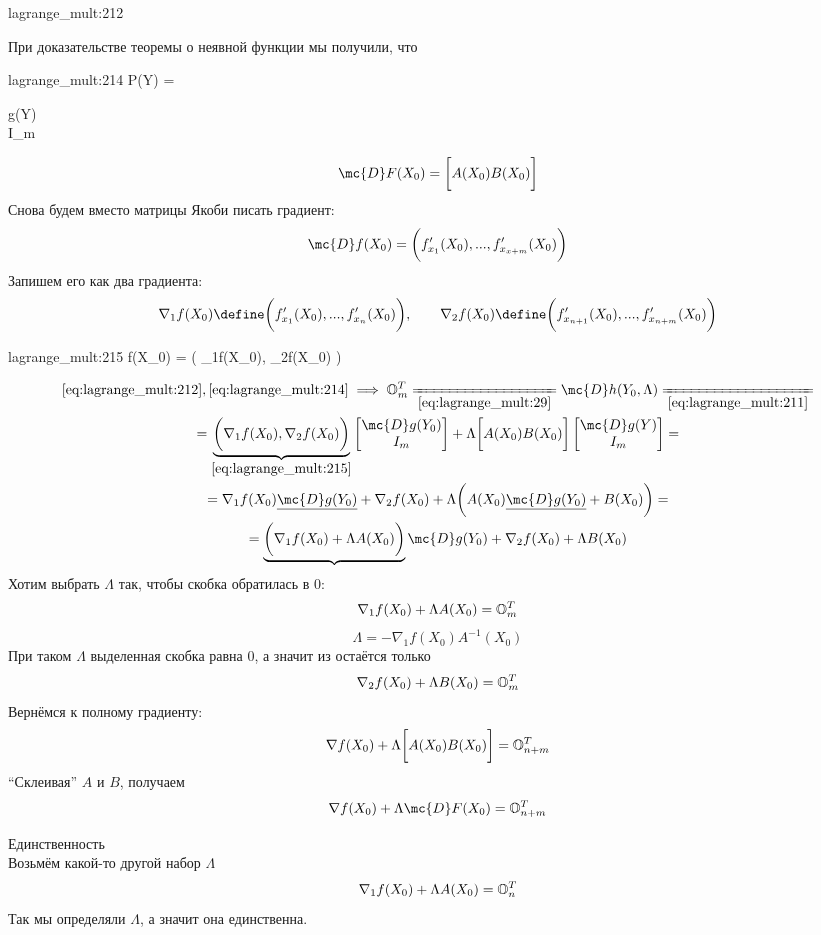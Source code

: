 \begin{iproof}
\begin{equ}{lagrange_mult:212}
\begin{rcases}
		\end{rcases}
	\end{equ}
	При доказательстве теоремы о неявной функции мы получили, что
	\begin{equ}{lagrange_mult:214}
		P(Y) =
		\begin{bmatrix}
			g(Y) \\
			I_m
		\end{bmatrix}
	\end{equ}
	$$ \mc{D}F(X_0) = \bigg[ A(X_0)B(X_0) \bigg] $$
	Снова будем вместо матрицы Якоби писать градиент:
	$$ \mc{D}f(X_0) = \bigg( f_{x_1}'(X_0), ..., f_{x_{x + m}}'(X_0) \bigg) $$
	Запишем его как два градиента:
	$$ \nabla_1f(X_0) \define \bigg( f_{x_1}'(X_0), ..., f_{x_n}'(X_0) \bigg), \qquad \nabla_2f(X_0) \define \bigg( f_{x_{n + 1}}'(X_0), ..., f_{x_{n + m}}'(X_0) \bigg) $$
	\begin{equ}{lagrange_mult:215}
		f(X_0) = \bigg( \nabla_1f(X_0), \nabla_2f(X_0) \bigg)
	\end{equ}
	\begin{multline}\lbl{lagrange_mult:216}
		\eref{lagrange_mult:212}, \eref{lagrange_mult:214} \implies \On[m]^T \undereq{\eref{lagrange_mult:29}} \mc{D}h(Y_0, \Lambda) \undereq{\eref{lagrange_mult:211}} \\
		= \underbrace{\bigg( \nabla_1f(X_0), \nabla_2f(X_0) \bigg)}_{\eref{lagrange_mult:215}}
		\begin{bmatrix}
			\mc{D}g(Y_0) \\
			I_m
		\end{bmatrix} + \Lambda \bigg[ A(X_0)B(X_0) \bigg]
		\begin{bmatrix}
			\mc{D}g(Y) \\
			I_m
		\end{bmatrix} = \\
		= \nabla_1f(X_0)\underline{\mc{D}g(Y_0)} + \nabla_2f(X_0) + \Lambda \bigg( A(X_0)\underline{\mc{D}g(Y_0)} + B(X_0) \bigg) = \\
		= \underbrace{\bigg( \nabla_1f(X_0) + \Lambda A(X_0) \bigg)} \mc{D}g(Y_0) + \nabla_2 f(X_0) + \Lambda B(X_0)
	\end{multline}
	Хотим выбрать $ \Lambda $ так, чтобы скобка обратилась в 0:
	$$ \nabla_1f(X_0) + \Lambda A(X_0) = \On[m]^T $$
	$$ \Lambda = -\nabla_1f(X_0) A^{-1}(X_0) $$
	При таком $ \Lambda $ выделенная скобка равна 0, а значит из  остаётся только
	$$ \nabla_2f(X_0) + \Lambda B(X_0) = \On[m]^T $$
	Вернёмся к полному градиенту:
	$$ \nabla f(X_0) + \Lambda \bigg[ A(X_0) B(X_0) \bigg] = \On[n + m]^T $$
	``Склеивая'' $ A $ и $ B $, получаем
	$$ \nabla f(X_0) + \Lambda \mc{D}F(X_0) = \On[n + m]^T $$
	\item Единственность \\
	Возьмём какой-то другой набор $ \Lambda $
	$$ \nabla_1 f(X_0) + \Lambda A(X_0) = \On[n]^T $$
	Так мы определяли $ \Lambda $, а значит она единственна.
\end{iproof}
